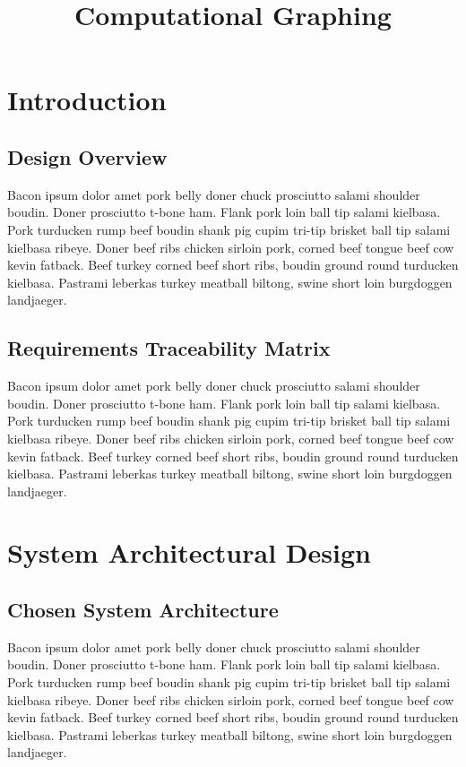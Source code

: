 \documentclass[12pt]{memoir}
\title{Computational Graphing}
\begin{document}
    \newcommand{\documentname}{Architectural Requirements Specification}
    
    \newpage

	\tableofcontents

	\newpage
	
	
	\section{Introduction}
	\subsection{Design Overview}
Bacon ipsum dolor amet pork belly doner chuck prosciutto salami shoulder boudin. Doner prosciutto t-bone ham. Flank pork loin ball tip salami kielbasa. Pork turducken rump beef boudin shank pig cupim tri-tip brisket ball tip salami kielbasa ribeye. Doner beef ribs chicken sirloin pork, corned beef tongue beef cow kevin fatback. Beef turkey corned beef short ribs, boudin ground round turducken kielbasa. Pastrami leberkas turkey meatball biltong, swine short loin burgdoggen landjaeger.

	\subsection{Requirements Traceability Matrix}
Bacon ipsum dolor amet pork belly doner chuck prosciutto salami shoulder boudin. Doner prosciutto t-bone ham. Flank pork loin ball tip salami kielbasa. Pork turducken rump beef boudin shank pig cupim tri-tip brisket ball tip salami kielbasa ribeye. Doner beef ribs chicken sirloin pork, corned beef tongue beef cow kevin fatback. Beef turkey corned beef short ribs, boudin ground round turducken kielbasa. Pastrami leberkas turkey meatball biltong, swine short loin burgdoggen landjaeger.

	\newpage
	\section{System Architectural Design}
	\subsection{Chosen System Architecture}
Bacon ipsum dolor amet pork belly doner chuck prosciutto salami shoulder boudin. Doner prosciutto t-bone ham. Flank pork loin ball tip salami kielbasa. Pork turducken rump beef boudin shank pig cupim tri-tip brisket ball tip salami kielbasa ribeye. Doner beef ribs chicken sirloin pork, corned beef tongue beef cow kevin fatback. Beef turkey corned beef short ribs, boudin ground round turducken kielbasa. Pastrami leberkas turkey meatball biltong, swine short loin burgdoggen landjaeger.
\end{document}
